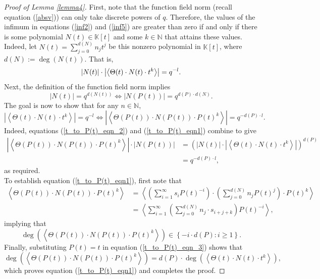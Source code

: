 \documentclass[10pt,a4paper]{amsart}
\newcommand{\K}{\mathbb{K}}
\newcommand{\N}{\mathbb{N}}
\begin{document}
 \begin{proof}[Proof of Lemma \ref{lemma4}]
 First, note that the function field norm (recall equation (\ref{absv})) can only take discrete powers of $q$. Therefore, the values of the infimum in equations (\ref{inf2}) and (\ref{inf5}) are greater than zero if and only if there is some polynomial $N(t)\in\K[t]$ and some $k\in\N$ that attains these values. Indeed, let $N(t)=\sum^{d(N)}_{j=0}n_jt^j$ be this nonzero polynomial in $\K[t]$, where $d(N):=\deg(N(t))$. That is,\vspace{-0.3cm}\begin{equation}|N(t)|\cdot \left|\left\langle\Theta(t)\cdot N(t) \cdot t^k\right\rangle\right|=q^{-l}.\vspace{-0.3cm}\nonumber\end{equation} \vspace{-0.3cm}\noindent Next, the definition of the function field norm implies \begin{equation}\label{t_to_P(t)_eqn_2}
     |N(t)|=q^{d(N(t))} \Leftrightarrow |N(P(t))|=q^{d(P)\cdot d(N)}.
 \end{equation}The goal is now to show that for any $n\in\N$, \begin{equation}
       \left|\left\langle\Theta(t)\cdot N(t) \cdot t^k\right\rangle\right|=q^{-l}\Leftrightarrow\left|\left\langle\Theta(P(t))\cdot N(P(t)) \cdot P(t)^k\right\rangle\right|=q^{-d(P)\cdot l}.\label{t_to_P(t)_eqn1}
 \end{equation}Indeed, equations (\ref{t_to_P(t)_eqn_2}) and (\ref{t_to_P(t)_eqn1}) combine to give \begin{align*}\left|\left\langle\Theta(P(t))\cdot N(P(t)) \cdot P(t)^k\right\rangle\right|\cdot |N(P(t))| &= \left(|N(t)|\cdot\left|\left\langle\Theta(t)\cdot N(t) \cdot t^k\right\rangle\right|\right)^{d(P)}\\&=q^{-d(P)\cdot l}, \end{align*} as required. \\
 
 \noindent To establish equation (\ref{t_to_P(t)_eqn1}), first note that \begin{align}
     \left\langle\Theta(P(t))\cdot N(P(t)) \cdot P(t)^k\right\rangle &= \left\langle\left(\sum^\infty_{i=1}s_iP(t)^{-i}\right)\cdot \left(\sum^{d(N)}_{j=0}n_jP(t)^j\right) \cdot P(t)^k\right\rangle\nonumber\\
     &=\left\langle\sum^\infty_{i=1}\left(\sum^{d(N)}_{j=0}n_j\cdot s_{i+j+k}\right)P(t)^{-i}\right\rangle,\label{t_to_P(t)_eqn_3}
 \end{align} implying that \begin{equation}
     \label{crucial} \deg\left(\left\langle\Theta(P(t))\cdot N(P(t)) \cdot P(t)^k\right\rangle\right)\in\left\{-i\cdot d(P): i\ge1\right\}.
 \end{equation}
 \noindent Finally, substituting $P(t)=t$ in equation (\ref{t_to_P(t)_eqn_3}) shows that $$\deg(\left\langle\Theta(P(t))\cdot N(P(t)) \cdot P(t)^k\right\rangle)=d(P)\cdot \deg(\left\langle\Theta(t)\cdot N(t) \cdot t^k\right\rangle),$$ which proves equation (\ref{t_to_P(t)_eqn1}) and completes the proof.
 \end{proof}
\end{document}
